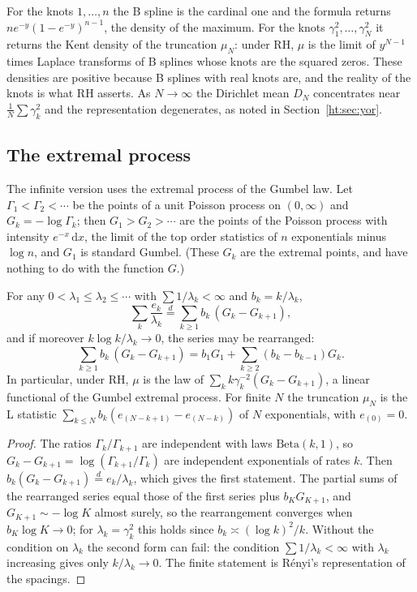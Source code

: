 For the knots $1,\dots,n$ the B spline is the cardinal one and the formula returns $ne^{-y}(1-e^{-y})^{n-1}$, the density of the maximum. For the knots $\gamma_1^2,\dots,\gamma_N^2$ it returns the Kent density of the truncation $\mu_N$: under RH, $\mu$ is the limit of $y^{N-1}$ times Laplace transforms of B splines whose knots are the squared zeros. These densities are positive because B splines with real knots are, and the reality of the knots is what RH asserts. As $N\to\infty$ the Dirichlet mean $D_N$ concentrates near $\frac1N\sum\gamma_k^2$ and the representation degenerates, as noted in Section~\ref{ht:sec:yor}.

\subsection{The extremal process}
The infinite version uses the extremal process of the Gumbel law. Let $\Gamma_1<\Gamma_2<\cdots$ be the points of a unit Poisson process on $(0,\infty)$ and $G_k=-\log\Gamma_k$; then $G_1>G_2>\cdots$ are the points of the Poisson process with intensity $e^{-x}\,\mathrm{d}x$, the limit of the top order statistics of $n$ exponentials minus $\log n$, and $G_1$ is standard Gumbel. (These $G_k$ are the extremal points, and have nothing to do with the function $G$.)

\begin{theorem}\label{ht:thm:extremal}
For any $0<\lambda_1\le\lambda_2\le\cdots$ with $\sum1/\lambda_k<\infty$ and $b_k=k/\lambda_k$,
\[
\sum_k\frac{e_k}{\lambda_k}\overset{d}{=}\sum_{k\ge1}b_k\,(G_k-G_{k+1}),
\]
and if moreover $k\log k/\lambda_k\to0$, the series may be rearranged:
\[
\sum_{k\ge1}b_k\,(G_k-G_{k+1})=b_1G_1+\sum_{k\ge2}(b_k-b_{k-1})G_k.
\]
In particular, under RH, $\mu$ is the law of $\sum_kk\gamma_k^{-2}(G_k-G_{k+1})$, a linear functional of the Gumbel extremal process. For finite $N$ the truncation $\mu_N$ is the L statistic $\sum_{k\le N}b_k(e_{(N-k+1)}-e_{(N-k)})$ of $N$ exponentials, with $e_{(0)}=0$.
\end{theorem}

\begin{proof}
The ratios $\Gamma_k/\Gamma_{k+1}$ are independent with laws $\mathrm{Beta}(k,1)$, so $G_k-G_{k+1}=\log(\Gamma_{k+1}/\Gamma_k)$ are independent exponentials of rates $k$. Then $b_k(G_k-G_{k+1})\overset d=e_k/\lambda_k$, which gives the first statement. The partial sums of the rearranged series equal those of the first series plus $b_KG_{K+1}$, and $G_{K+1}\sim-\log K$ almost surely, so the rearrangement converges when $b_K\log K\to0$; for $\lambda_k=\gamma_k^2$ this holds since $b_k\asymp(\log k)^2/k$. Without the condition on $\lambda_k$ the second form can fail: the condition $\sum1/\lambda_k<\infty$ with $\lambda_k$ increasing gives only $k/\lambda_k\to0$. The finite statement is R\'enyi's representation of the spacings.
\end{proof}

